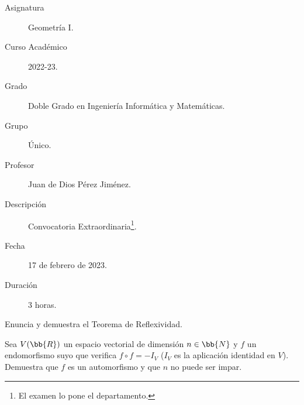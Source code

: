 \documentclass[12pt]{article}
\begin{document}

    
    

    \begin{description}
        \item[Asignatura] Geometría I.
        \item[Curso Académico] 2022-23.
        \item[Grado] Doble Grado en Ingeniería Informática y Matemáticas.
        \item[Grupo] Único.
        \item[Profesor] Juan de Dios Pérez Jiménez.
        \item[Descripción] Convocatoria Extraordinaria\footnote{El examen lo pone el departamento.}.
        \item[Fecha] 17 de febrero de 2023.
        \item[Duración] 3 horas.
    
    \end{description}
    \newpage

    \begin{ejercicio}[2,5 puntos]
        Enuncia y demuestra el Teorema de Reflexividad.
    \end{ejercicio}

    \begin{ejercicio}[2 puntos]
        Sea $V(\bb{R})$ un espacio vectorial de dimensión $n\in \bb{N}$ y $f$ un endomorfismo suyo que verifica $f\circ f=-I_V$ ($I_V$ es la aplicación identidad en $V$).
        Demuestra que $f$ es un automorfismo y que $n$ no puede ser impar.
    \end{ejercicio}
        
\end{document}
